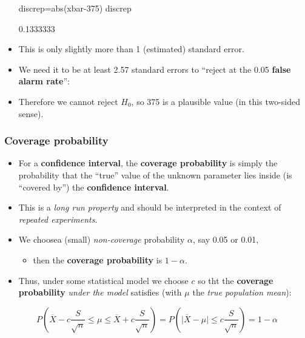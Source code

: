 \documentclass[a4paper]{article}
\begin{document}
\begin{itemize}
\begin{Schunk}
\begin{Sinput}
discrep=abs(xbar-375)
discrep 
\end{Sinput}
\begin{Soutput}
[1] 0.1333333
\end{Soutput}
\end{Schunk}
	\item This is only slightly more than 1 (estimated) standard error.
	\item We need it to be at least 2.57 standard errors to ``reject at the 0.05 \textcolor{mygreen}{\textbf{false alarm rate}}'':
	\item Therefore we cannot reject \( H_0 \), so 375 is a plausible value (in this two-sided sense).
\end{itemize}
\subsubsection{Coverage probability}
\begin{itemize}
	\item For a \textcolor{myred}{\textbf{confidence interval}}, the \textcolor{myred}{\textbf{coverage probability}} is simply the probability that the ``true'' value of the unknown parameter lies inside (is ``covered by'') the \textcolor{mygreen}{\textbf{confidence interval}}.
	\item This is a \textit{long run property} and should be interpreted in the context of \textit{repeated experiments}.
	\item We choosea (small) \textit{non-coverage} probability \( \alpha \), say 0.05 or 0.01,
	\begin{itemize}
		\item then the \textcolor{myred}{\textbf{coverage probability}} is \( 1-\alpha \). 
	\end{itemize}
	\item Thus, under some statistical model we choose \( c \) so tht the  \textcolor{myred}{\textbf{coverage probability}} \textit{under the model} satisfies (with \( \mu \) the \textit{true population mean}):
\end{itemize}
\[
	P \left( \overline{X} - c \frac{S}{\sqrt{n}} \leq \mu \leq \overline{X} + c \frac{S}{\sqrt{n}} \right) = P \left( \lvert \overline{X} - \mu \rvert \leq c \frac{S}{\sqrt{n}} \right) = 1 - \alpha
\]
\end{document}
